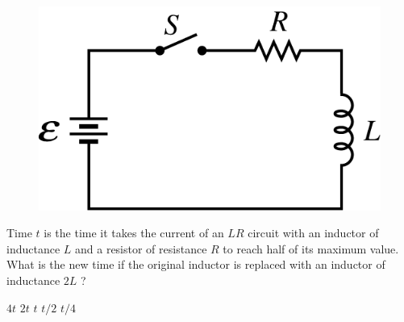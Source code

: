 \begin{figure}[H]
    \centering
    \includegraphics[scale=0.3]{images/img-005-007.png}
\end{figure}

\begin{questions}\setcounter{question}{6}\question
Time $t$ is the time it takes the current of an $L R$ circuit with an inductor of inductance $L$ and a resistor of resistance $R$ to reach half of its maximum value. What is the new time if the original inductor is replaced with an inductor of inductance $2 L$ ?

\begin{oneparchoices}
\choice $4 t$
\choice $2 t$
\choice $t$
\choice $t / 2$
\choice $t / 4$
\end{oneparchoices}\end{questions}

